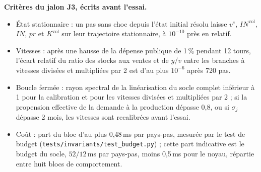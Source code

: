 \documentclass[11pt,a4paper]{article}
\begin{document}
\textbf{Critères du jalon J3, écrits avant l'essai.}
\begin{itemize}
\item État stationnaire : un pas sans choc depuis l'état initial résolu laisse $v^e$, $\mathit{IN}^{\mathrm{vol}}$, $\mathit{IN}$, $\mathit{pr}$ et $K^{\mathrm{vol}}$ sur leur trajectoire stationnaire, à $10^{-10}$ près en relatif.
\item Vitesses : après une hausse de la dépense publique de 1\,\% pendant 12 tours, l'écart relatif du ratio des stocks aux ventes et de $y/v$ entre les branches à vitesses divisées et multipliées par 2 est d'au plus $10^{-6}$ après 720 pas.
\item Boucle fermée : rayon spectral de la linéarisation du socle complet inférieur à 1 pour la calibration et pour les vitesses divisées et multipliées par 2 ; si la propension effective de la demande à la production dépasse 0,8, ou si $\sigma_j$ dépasse 2 mois, les vitesses sont recalibrées avant l'essai.
\item Coût : part du bloc d'au plus 0,48\,ms par pays-pas, mesurée par le test de budget (\nolinkurl{tests/invariants/test_budget.py}) ; cette part indicative est le budget du socle, $52/12$\,ms par pays-pas, moins 0,5\,ms pour le noyau, répartie entre huit blocs de comportement.
\end{itemize}
\end{document}
